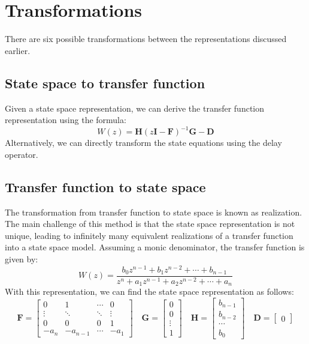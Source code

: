 \section{Transformations}

There are six possible transformations between the representations discussed earlier.

\subsection{State space to transfer function}
Given a state space representation, we can derive the transfer function representation using the formula:
\[W(z)=\mathbf{H}{\left(z\mathbf{I}-\mathbf{F}\right)}^{-1}\mathbf{G}-\mathbf{D}\]
Alternatively, we can directly transform the state equations using the delay operator.

\subsection{Transfer function to state space}
The transformation from transfer function to state space is known as realization. 
The main challenge of this method is that the state space representation is not unique, leading to infinitely many equivalent realizations of a transfer function into a state space model. 
Assuming a monic denominator, the transfer function is given by:
\[W(z)=\dfrac{b_0z^{n-1}+b_1z^{n-2}+\cdots+ b_{n-1}}{z^n+a_1z^{n-1}+a_2z^{n-2}+\cdots+a_n}\]
With this representation, we can find the state space representation as follows:
\[ \mathbf{F}=\begin{bmatrix} 0 & 1 & \cdots & 0 \\ \vdots & \ddots  & \ddots & \vdots \\ 0 & 0 & 0 & 1 \\ -a_n & -a_{n-1} & \cdots & -a_1 \end{bmatrix} \quad  \mathbf{G}=\begin{bmatrix} 0 \\ 0 \\ \vdots \\ 1 \end{bmatrix} \quad  \mathbf{H}=\begin{bmatrix} b_{n-1} \\ b_{n-2} \\ \cdots \\ b_0 \end{bmatrix} \quad  \mathbf{D}=\begin{bmatrix} 0 \end{bmatrix}\]


